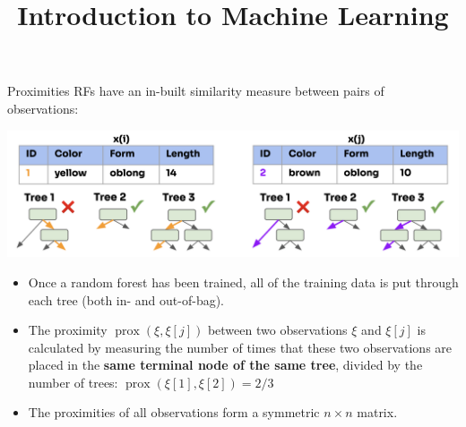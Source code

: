 \documentclass[11pt,compress,t,notes=noshow, xcolor=table]{beamer}
\title{Introduction to Machine Learning}
\begin{document}

\begin{vbframe}{Proximities}
RFs have an in-built similarity measure between pairs of observations: 

\begin{center}
\includegraphics[width=1\textwidth]{figure_man/forest-proximities.png}
\end{center}

\begin{itemize}
  \item Once a random forest has been trained, all of the training data is put through each tree (both in- and out-of-bag).
  \item The proximity $\operatorname{prox}\left(\xi, \xi[j]\right)$
  between two observations $\xi$ and $\xi[j]$ is calculated by measuring the number of times that these two observations are placed in the \textbf{same terminal node of the same tree}, divided by the number of trees: $\operatorname{prox}\left(\xi[1], \xi[2]\right) = 2/3$
  \item The proximities of all observations form a symmetric $n \times n$ matrix.
\end{itemize}

\end{vbframe}
\end{document}
